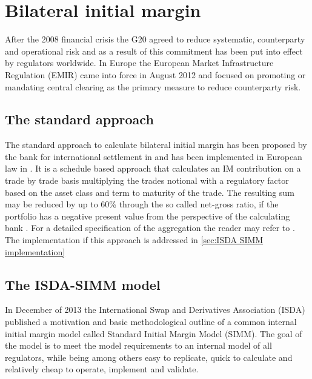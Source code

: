 \documentclass[../Thesis_AHoecherl.tex]{subfiles}
\begin{document}
    \section{Bilateral initial margin}\label{Bilateral initial margin}
    
    After the 2008 financial crisis the G20 agreed to reduce systematic, counterparty and operational risk and as a result of this commitment has been put into effect by regulators worldwide. In Europe the European Market Infrastructure Regulation (EMIR) came into force in August 2012 and focused on promoting or mandating central clearing as the primary measure to reduce counterparty risk.

    \subsection{The standard approach}\label{The standard approach}


    The standard approach to calculate bilateral initial margin has been proposed by the bank for international settlement in  and has been implemented in European law in . It is a schedule based approach that calculates an \gls{IM} contribution on a trade by trade basis multiplying the trades notional with a regulatory factor based on the asset class and term to maturity of the trade.
    The resulting sum may be reduced by up to 60\% through the so called net-gross ratio, if the portfolio has a negative present value from the perspective of the calculating bank .
    For a detailed specification of the aggregation the reader may refer to . The implementation if this approach is addressed in \ref{sec:ISDA SIMM implementation} 
    
    \subsection{The ISDA-SIMM model}
    In December of 2013 the International Swap and Derivatives Association (ISDA) published a motivation and basic methodological outline of a common internal initial margin model called Standard Initial Margin Model (SIMM\texttrademark)\cite{ISDADec2013}. The goal of the model is to meet the model requirements to an internal model of all regulators, while being among others easy to replicate, quick to calculate and relatively cheap to operate, implement and validate.
\end{document}

